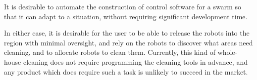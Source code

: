It is desirable to automate the construction of control software for a swarm so that it can adapt to a situation, without requiring significant development time. 

In either case, it is desirable for the user to be able to release the robots into the region with minimal oversight, and rely on the robots to discover what areas need cleaning, and to allocate robots to clean them. 
Currently, this kind of whole-house cleaning does not require programming the cleaning tools in advance, and any product which does require such a task is unlikely to succeed in the market. 



